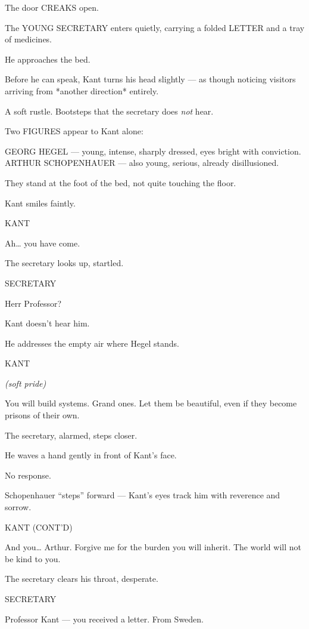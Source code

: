 \documentclass[12pt]{article}
\newenvironment{dialogue}[1]{%
  \vspace{0.8\baselineskip}%
  \noindent\hspace*{2.3in}\textsc{#1}\par%
  \noindent\hspace*{1.5in}\begin{minipage}[t]{4.5in}%
}{%
  \end{minipage}\par%
}
\newcommand{\paren}[1]{%
  \noindent\hspace*{1.8in}\textit{(#1)}\par%
}
\begin{document}
The door CREAKS open.

The YOUNG SECRETARY enters quietly, carrying a folded LETTER and a tray of medicines.

He approaches the bed.

Before he can speak, Kant turns his head slightly — as though noticing visitors arriving from *another direction* entirely.

A soft rustle.
Bootsteps that the secretary does \emph{not} hear.

Two FIGURES appear to Kant alone:

GEORG HEGEL — young, intense, sharply dressed, eyes bright with conviction.
ARTHUR SCHOPENHAUER — also young, serious, already disillusioned.

They stand at the foot of the bed, not quite touching the floor.

Kant smiles faintly.

\begin{dialogue}{KANT}
Ah… you have come.
\end{dialogue}

The secretary looks up, startled.

\begin{dialogue}{SECRETARY}
Herr Professor?
\end{dialogue}

Kant doesn't hear him.

He addresses the empty air where Hegel stands.

\begin{dialogue}{KANT}
\paren{soft pride}
You will build systems.
Grand ones.
Let them be beautiful, even if they become prisons of their own.
\end{dialogue}

The secretary, alarmed, steps closer.

He waves a hand gently in front of Kant’s face.

No response.

Schopenhauer “steps” forward — Kant’s eyes track him with reverence and sorrow.

\begin{dialogue}{KANT (CONT'D)}
And you…
Arthur.
Forgive me for the burden you will inherit.
The world will not be kind to you.
\end{dialogue}

The secretary clears his throat, desperate.

\begin{dialogue}{SECRETARY}
Professor Kant —
you received a letter.
From Sweden.
\end{dialogue}
\end{document}
